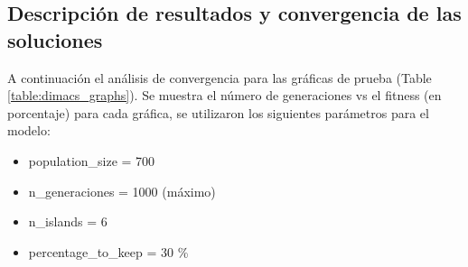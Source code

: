 \documentclass{article}
\begin{document}
\subsection{Descripción de resultados y convergencia de las soluciones}
A continuación el análisis de convergencia para las gráficas de prueba (Table \ref{table:dimacs_graphs}). Se muestra el número de generaciones vs el fitness (en porcentaje) para cada gráfica, se utilizaron los siguientes parámetros para el modelo: 
\begin{itemize}
    \item population\_size = 700
    \item n\_generaciones = 1000 (máximo)  
    \item n\_islands = 6
    \item percentage\_to\_keep = 30 \% 
\end{itemize}
\end{document}
